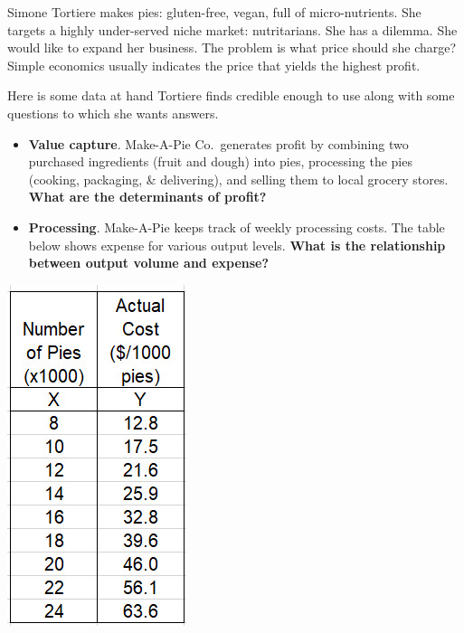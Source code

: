 \documentclass[
]{book}
\begin{document}
Simone Tortiere makes pies: gluten-free, vegan, full of micro-nutrients. She targets a highly under-served niche market: nutritarians. She has a dilemma. She would like to expand her business. The problem is what price should she charge? Simple economics usually indicates the price that yields the highest profit.

Here is some data at hand Tortiere finds credible enough to use along with some questions to which she wants answers.

\begin{itemize}
\item
  \textbf{Value capture}. Make-A-Pie Co.~generates profit by combining two purchased ingredients (fruit and dough) into pies, processing the pies (cooking, packaging, \& delivering), and selling them to local grocery stores. \textbf{What are the determinants of profit?}
\item
  \textbf{Processing}. Make-A-Pie keeps track of weekly processing costs. The table below shows expense for various output levels. \textbf{What is the relationship between output volume and expense?}
\end{itemize}

\includegraphics{images/01/pie-cost-table.jpg}
\end{document}
